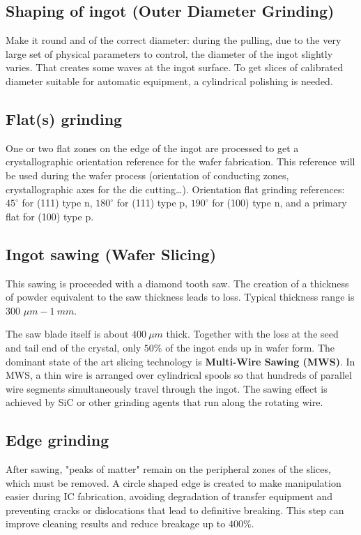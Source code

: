 \documentclass{report}
\begin{document}
\subsection{Shaping of ingot (Outer Diameter Grinding)}
Make it round and of the correct diameter: during the pulling, due to the very large set of
physical parameters to control, the diameter of the ingot slightly varies. That creates
some waves at the ingot surface. To get slices of calibrated diameter suitable for
automatic equipment, a cylindrical polishing is needed.

\subsection{Flat(s) grinding}
One or two flat zones on the edge of the ingot are
processed to get a crystallographic orientation reference
for the wafer fabrication. This reference will be used during
the wafer process (orientation of conducting zones,
crystallographic axes for the die cutting…).
Orientation flat grinding references: $45^{\circ}$ for (111) type n, $180^{\circ}$ for (111) type p, $190^{\circ}$ for (100) type n, and a primary flat for (100) type p.

\subsection{Ingot sawing (Wafer Slicing)}
This sawing is proceeded with a diamond tooth saw. The creation of a thickness of powder equivalent to the saw thickness leads to loss. Typical thickness range is 300 $\mu m - 1~mm$.

The saw blade itself is about $400~\mu m$ thick. Together with the loss at the seed and tail end of the crystal, only $50\%$ of the ingot ends up in wafer form.
The dominant state of the art slicing technology is \textbf{Multi-Wire Sawing (MWS)}. In MWS, a thin wire is arranged over cylindrical spools so that hundreds of parallel wire segments simultaneously travel through the ingot. The sawing effect is achieved by SiC or other grinding agents that run along the rotating wire.

\subsection{Edge grinding}
After sawing, "peaks of matter" remain on the peripheral zones of the slices, which must be removed. A circle shaped edge is created to make manipulation easier during IC fabrication, avoiding degradation of transfer equipment and preventing cracks or dislocations that lead to definitive breaking. This step can improve cleaning results and reduce breakage up to $400\%$.
\end{document}
